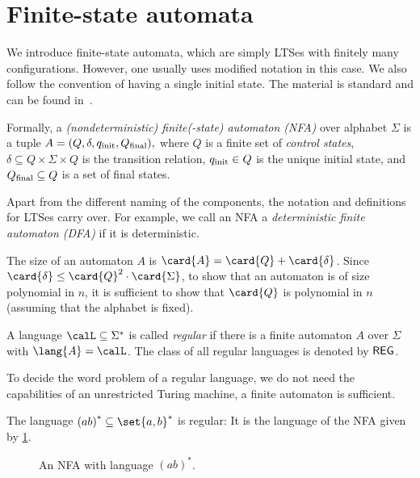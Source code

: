 \documentclass[../../diss.tex]{subfiles}
\begin{document}
\section{Finite-state automata}

We introduce finite-state automata, which are simply LTSes with finitely many configurations.
However, one usually uses modified notation in this case.
We also follow the convention of having a single initial state.
The material is standard and can be found \eg in~\cite{KhoussainovN01,Kozen97}.

Formally, a \emph{(nondeterministic) finite(-state) automaton (NFA)} over alphabet $\Sigma$ is a tuple
\(
    A = (Q, \delta, q_{\text{init}}, Q_{\text{final}})
    ,
\)
where
    $Q$ is a finite set of \emph{control states},
    $\delta \subseteq Q \times \Sigma \times Q$ is the transition relation,
    $q_{\text{init}} \in Q$ is the unique initial state, and
    $Q_{\text{final}} \subseteq Q$ is a set of final states.

Apart from the different naming of the components, the notation and definitions for LTSes carry over.
For example, we call an NFA a \emph{deterministic finite automaton (DFA)} if it is deterministic.

The size of an automaton $A$ is $\card{A} = \card{Q} + \card{\delta}$.
Since $\card{\delta} \leq \card{Q}^2 \cdot \card{\Sigma}$, to show that an automaton is \eg of size polynomial in $n$, it is sufficient to show that $\card{Q}$ is polynomial in $n$ (assuming that the alphabet is fixed).

A language $\calL \subseteq \Sigma^*$ is called \emph{regular} if there is a finite automaton $A$ over $\Sigma$ with $\lang{A} = \calL$.
The class of all regular languages is denoted by ${\mathsf{REG}}$.

To decide the word problem of a regular language, we do not need the capabilities of an unrestricted Turing machine, a finite automaton is sufficient.

\begin{example}%
\label{Example:NFAForABStar}%
    The language ${(ab)}^* \subseteq \set{a,b}^*$ is regular: It is the language of the NFA given by \cref{Figure:NFAForABStar}.
\end{example}

\begin{figure}
    \centering%
    \caption{An NFA with language ${(ab)}^*$.}%
    \label{Figure:NFAForABStar}%
\end{figure}
\end{document}
